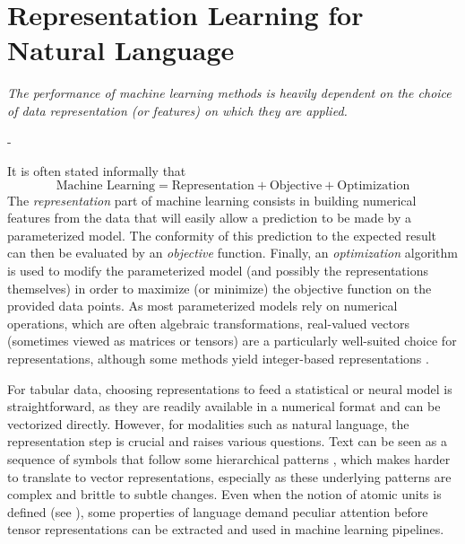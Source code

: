 \chapter{Representation Learning for Natural Language}

\begin{center}
  \begin{minipage}{0.7\textwidth}
    \textit{The performance of machine learning methods is heavily
dependent on the choice of data representation (or
features) on which they are applied.} 
\begin{flushright}- \citet{bengio_repr} \end{flushright}
  \end{minipage}
\end{center}

It is often stated informally that 
$$
\text{Machine Learning} = \text{Representation} + \text{Objective} + \text{Optimization}
$$
The \textit{representation} part of machine learning consists in building numerical features from the data that will easily allow a prediction to be made by a parameterized model. The conformity of this prediction to the expected result can then be evaluated by an \textit{objective} function. Finally, an \textit{optimization} algorithm is used to modify the parameterized model (and possibly the representations themselves) in order to maximize (or minimize) the objective function on the provided data points. As most parameterized models rely on numerical operations, which are often algebraic transformations, real-valued vectors (sometimes viewed as matrices or tensors) are a particularly well-suited choice for representations, although some methods yield integer-based representations \citep{10.5555/3295222.3295378}.

For tabular data, choosing representations to feed a statistical or neural model is straightforward, as they are readily available in a numerical format and can be vectorized directly. However, for modalities such as natural language, the representation step is crucial and raises various questions. Text can be seen as a sequence of symbols that follow some hierarchical patterns \citep{longacre}, which makes harder to translate to vector representations, especially as these underlying patterns are complex and brittle to subtle changes. Even when the notion of atomic units is defined (see ), some properties of language demand peculiar attention before tensor representations can be extracted and used in machine learning pipelines.

